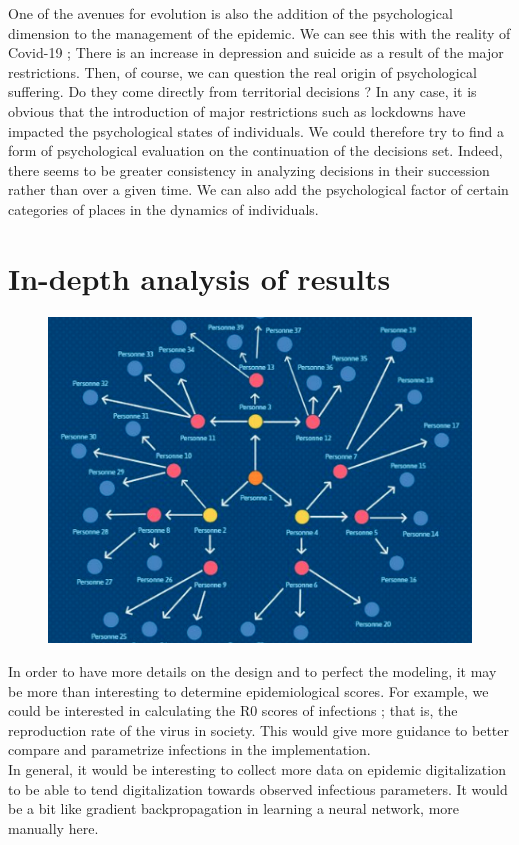 One of the avenues for evolution is also the addition of the psychological dimension to the management of the epidemic. We can see this with the reality of Covid-19 ; There is an increase in depression and suicide as a result of the major restrictions. Then, of course, we can question the real origin of psychological suffering. Do they come directly from territorial decisions ? In any case, it is obvious that the introduction of major restrictions such as lockdowns have impacted the psychological states of individuals. We could therefore try to find a form of psychological evaluation on the continuation of the decisions set. Indeed, there seems to be greater consistency in analyzing decisions in their succession rather than over a given time. We can also add the psychological factor of certain categories of places in the dynamics of individuals.\\

\section{In-depth analysis of results}

\begin{figure}[h]
  \centering
  \includegraphics[width=0.8\linewidth]{media/r0.png}
  \caption{}
  \label{fig:r0}
\end{figure}

In order to have more details on the design and to perfect the modeling, it may be more than interesting to determine epidemiological scores. For example, we could be interested in calculating the R0 scores of infections ; that is, the reproduction rate of the virus in society. This would give more guidance to better compare and parametrize infections in the implementation.\\

In general, it would be interesting to collect more data on epidemic digitalization to be able to tend digitalization towards observed infectious parameters. It would be a bit like gradient backpropagation in learning a neural network, more manually here.\\